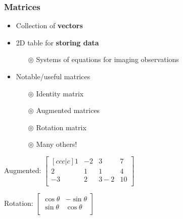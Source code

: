 \documentclass{beamer}
\begin{document}
\begin{frame}[t]\vspace{5pt}
\frametitle{Matrices}
\begin{itemize}
\item Collection of \textbf{vectors}
\item 2D table for \textbf{storing data}
	\begin{itemize}
		\item[$\circledcirc$] Systems of equations for imaging observations
	\end{itemize}
\item Notable/useful matrices
	\begin{itemize}
		\item[$\circledcirc$] Identity matrix
		\item[$\circledcirc$] Augmented matrices
		\item[$\circledcirc$] Rotation matrix
		\item[$\circledcirc$] Many others!
	\end{itemize}
\end{itemize}

Augmented:
$\begin{bmatrix}[ccc|c]
1 & -2 & 3 & 7\\
2 & 1 & 1 & 4\\
-3 & 2 & 3-2& 10\\
\end{bmatrix}$

Rotation: \hspace{9pt}
$\begin{bmatrix}
\cos{\theta} & -\sin{\theta} \\
\sin{\theta} & \cos{\theta} \\

\end{bmatrix}$

\end{frame}
\end{document}
